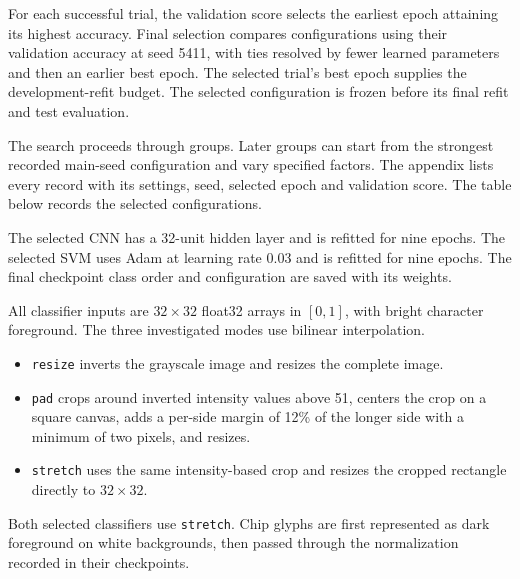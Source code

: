 For each successful trial, the validation score selects the earliest epoch attaining its highest accuracy. Final selection compares configurations using their validation accuracy at seed 5411, with ties resolved by fewer learned parameters and then an earlier best epoch. The selected trial's best epoch supplies the development-refit budget. The selected configuration is frozen before its final refit and test evaluation.

The search proceeds through groups. Later groups can start from the strongest recorded main-seed configuration and vary specified factors. The appendix lists every record with its settings, seed, selected epoch and validation score. The table below records the selected configurations.

The selected CNN has a 32-unit hidden layer and is refitted for nine epochs. The selected SVM uses Adam at learning rate 0.03 and is refitted for nine epochs. The final checkpoint class order and configuration are saved with its weights.

All classifier inputs are $32\times32$ float32 arrays in $[0,1]$, with bright character foreground. The three investigated modes use bilinear interpolation.
\begin{itemize}
\item \texttt{resize} inverts the grayscale image and resizes the complete image.
\item \texttt{pad} crops around inverted intensity values above 51, centers the crop on a square canvas, adds a per-side margin of 12\% of the longer side with a minimum of two pixels, and resizes.
\item \texttt{stretch} uses the same intensity-based crop and resizes the cropped rectangle directly to $32\times32$.
\end{itemize}
Both selected classifiers use \texttt{stretch}. Chip glyphs are first represented as dark foreground on white backgrounds, then passed through the normalization recorded in their checkpoints.

